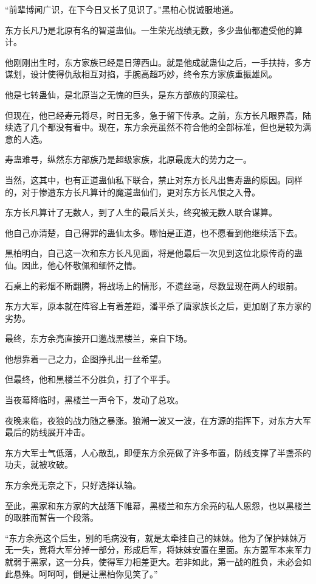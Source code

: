 \begin{this_body}
“前辈博闻广识，在下今日又长了见识了。”黑柏心悦诚服地道。

东方长凡乃是北原有名的智道蛊仙。一生荣光战绩无数，多少蛊仙都遭受他的算计。

他刚刚出生时，东方家族已经是日薄西山。就是他成就蛊仙之后，一手扶持，多方谋划，设计使得仇敌相互对掐，手腕高超巧妙，终令东方家族重振雄风。

他是七转蛊仙，是北原当之无愧的巨头，是东方部族的顶梁柱。

但现在，他已经寿元将尽，时日无多，急于留下传承。之前，东方长凡眼界高，陆续选了几个都没有看中。现在，东方余亮虽然不符合他的全部标准，但也是较为满意的人选。

寿蛊难寻，纵然东方部族乃是超级家族，北原最庞大的势力之一。

当然，这其中，也有正道蛊仙私下联合，禁止对东方长凡出售寿蛊的原因。同样的，对于惨遭东方长凡算计的魔道蛊仙们，更对东方长凡恨之入骨。

东方长凡算计了无数人，到了人生的最后关头，终究被无数人联合谋算。

他自己亦清楚，自己得罪的蛊仙太多。哪怕是正道，也不愿看到他继续活下去。

黑柏明白，自己这一次和东方长凡见面，将是他最后一次见到这位北原传奇的蛊仙。因此，他心怀敬佩和缅怀之情。

石桌上的彩烟不断翻腾，将战场上的情形，不遗丝毫，尽数显现在两人的眼前。

东方大军，原本就在阵容上有着差距，潘平杀了唐家族长之后，更加剧了东方家的劣势。

最终，东方余亮直接开口邀战黑楼兰，亲自下场。

他想靠着一己之力，企图挣扎出一丝希望。

但最终，他和黑楼兰不分胜负，打了个平手。

当夜幕降临时，黑楼兰一声令下，发动了总攻。

夜晚来临，夜狼的战力随之暴涨。狼潮一波又一波，在方源的指挥下，对东方大军最后的防线展开冲击。

东方大军士气低落，人心散乱，即便东方余亮做了许多布置，防线支撑了半盏茶的功夫，就被攻破。

东方余亮无奈之下，只好选择认输。

至此，黑家和东方家的大战落下帷幕，黑楼兰和东方余亮的私人恩怨，也以黑楼兰的取胜而暂告一个段落。

“东方余亮这个后生，别的毛病没有，就是太牵挂自己的妹妹。他为了保护妹妹万无一失，竟将大军分掉一部分，形成后军，将妹妹安置在里面。东方盟军本来军力就弱于黑家，这一分兵，使得军力相差更大。若非如此，第一战的胜负，未必会如此悬殊。呵呵呵，倒是让黑柏你见笑了。”


\end{this_body}
